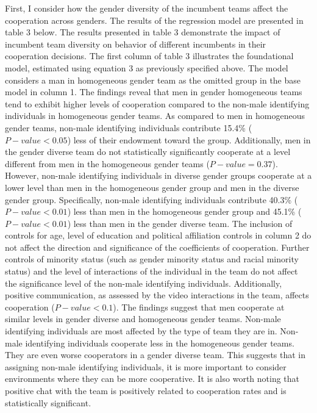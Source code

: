 \noindent First, I consider how the gender diversity of the incumbent teams affect the cooperation across genders. The results of the  regression model are presented in table 3 below. The results presented in table 3 demonstrate the impact of incumbent team diversity on behavior of different incumbents in their cooperation decisions. The first column of table 3 illustrates the foundational model, estimated using equation 3 as previously specified above. The model considers a man in homogeneous gender team as the omitted group in the base model in column 1. The findings reveal that men in gender homogeneous teams tend to exhibit higher levels of cooperation compared to the non-male identifying individuals in homogeneous gender teams. As compared to men in homogeneous gender teams, non-male identifying individuals contribute 15.4\% ($P-value<0.05$) less of their endowment toward the group. Additionally, men in the gender diverse team do not statistically significantly cooperate at a level different from men in the homogeneous gender teams ($P-value=0.37$). However, non-male identifying individuals in diverse gender groups cooperate at a lower level than  men in the homogeneous gender group and men in the diverse gender group.  Specifically, non-male identifying individuals contribute 40.3\% ($P-value<0.01$) less than men in the homogeneous gender group and 45.1\% ($P-value<0.01$) less than men in the gender diverse team. The inclusion of controls for age, level of education and political affiliation controls in column 2 do not affect the direction and significance of the coefficients of cooperation. Further controls of minority status (such as gender minority status and racial minority status) and the level of interactions of the individual in the team do not affect the significance level of the non-male identifying individuals. Additionally, positive communication, as assessed by the video interactions in the team, affects cooperation ($P-value<0.1$). The findings suggest that men cooperate at similar levels in gender diverse and homogeneous gender teams. Non-male identifying individuals are most affected by the type of team they are in. Non-male identifying individuals cooperate less in the homogeneous gender teams. They are even worse cooperators in a gender diverse team. This suggests that in assigning non-male identifying individuals, it is more important to consider environments where they can be more cooperative. It is also worth noting that positive chat with the team is positively related to cooperation rates and is statistically significant.  

